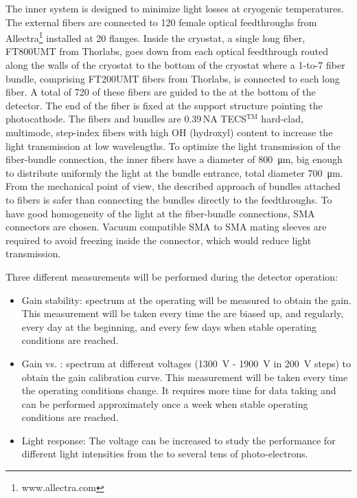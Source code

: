 
The inner system is designed to minimize light losses at cryogenic temperatures. The external fibers are connected to 120 female optical feedthroughs from Allectra\footnote{www.allectra.com} installed at \num{20} flanges. Inside the cryostat, a single long fiber, FT800UMT from Thorlabs, goes down from each optical feedthrough routed along the walls of the cryostat to the bottom of the cryostat where a \num{1}-to-\num{7} fiber bundle, comprising FT200UMT fibers from Thorlabs, is connected to each long fiber. A total of \num{720} of these fibers are guided to the  at the bottom of the detector. The end of the fiber is fixed at the  support structure pointing the photocathode. The fibers and bundles are \num{0.39}\,NA TECS$^\text{TM}$ hard-clad, multimode, step-index fibers with high OH (hydroxyl) content to increase the light transmission at low wavelengths. To optimize the light transmission of the fiber-bundle connection, the inner fibers have a diameter of \SI{800}{\um}, big enough to distribute uniformly the light at the bundle entrance, total diameter \SI{700}{\um}. From the mechanical point of view, the described approach of bundles attached to fibers is safer than connecting  the bundles directly to the feedthroughs. To have good homogeneity of the light at the fiber-bundle connections, SMA connectors are chosen. Vacuum compatible SMA to SMA mating sleeves are required to avoid  freezing inside the connector, which would reduce light transmission.

Three different measurements will be performed during the detector operation:
\begin{itemize}
    \item Gain stability:  spectrum at the  operating  will be measured to obtain the gain. This measurement will be taken every time the  are biased up, and regularly, every day at the beginning, and every few days when stable operating conditions are reached.
    \item Gain vs. :  spectrum at different  voltages (\SI{1300}{\V} - \SI{1900}{V} in \SI{200}{V} steps) to obtain the gain calibration curve. This measurement will be taken every time the operating conditions change. It requires more time for data taking and can be performed approximately once a week when stable operating conditions are reached.  
    \item Light response: The  voltage can be increased to study the  performance for different light intensities from the  to several tens of photo-electrons.
\end{itemize}

